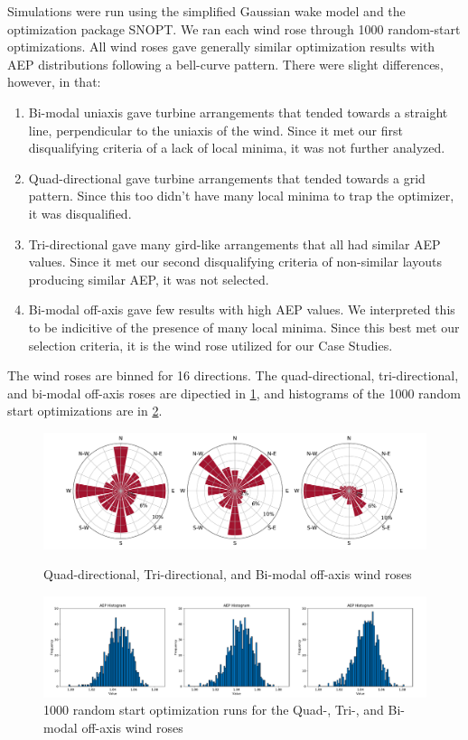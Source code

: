 	Simulations were run using the simplified Gaussian wake model and the optimization package SNOPT.
	We ran each wind rose through 1000 random-start optimizations.
	All wind roses gave generally similar optimization results with AEP distributions following a bell-curve pattern.
	There were slight differences, however, in that:

	\begin{enumerate}
		\item Bi-modal uniaxis gave turbine arrangements that tended towards a straight line, perpendicular to the uniaxis of the wind. Since it met our first disqualifying criteria of a lack of local minima, it was not further analyzed.
		\item Quad-directional gave turbine arrangements that tended towards a grid pattern. Since this too didn't have many local minima to trap the optimizer, it was disqualified.
		\item Tri-directional gave many gird-like arrangements that all had similar AEP values. Since it met our second disqualifying criteria of non-similar layouts producing similar AEP, it was not selected.
		\item Bi-modal off-axis gave few results with high AEP values. We interpreted this to be indicitive of the presence of many local minima. Since this best met our selection criteria, it is the wind rose utilized for our Case Studies.
	\end{enumerate}
	
	The wind roses are binned for 16 directions.
	The quad-directional, tri-directional, and bi-modal off-axis roses are dipectied in \cref{fig:testroses}, and histograms of the 1000 random start optimizations are in \cref{fig:rosehists}.

	\begin{figure}[H]
		\centering
			\caption{Quad-directional, Tri-directional, and Bi-modal off-axis wind roses}
			\includegraphics[width=\textwidth]{./figures/testroses.pdf}
		\label{fig:testroses}
	\end{figure}

	\begin{figure}[H]
		\centering
			\includegraphics[width=\textwidth]{./figures/rosehists.pdf}
		\caption{1000 random start optimization runs for the Quad-, Tri-, and Bi-modal off-axis wind roses}
		\label{fig:rosehists}
	\end{figure}

